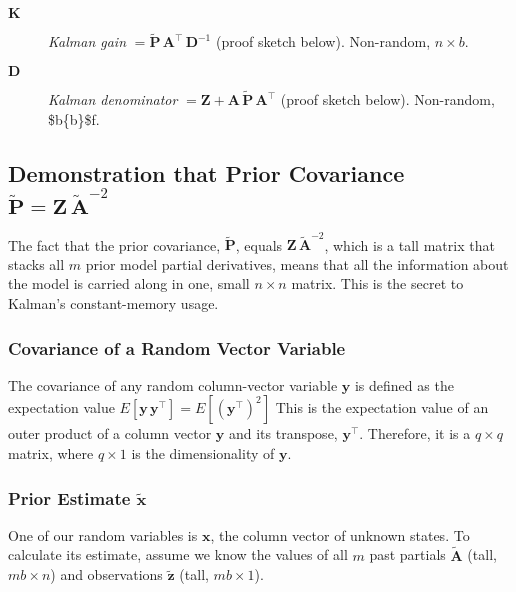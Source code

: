 \documentclass[10pt,oneside,x11names]{article}
\begin{document}
\begin{description}
\item[{\(\mathbold{K}\)}] \emph{Kalman gain}
\(=
     {\tilde{\mathbold{P}}}\,
     \mathbold{A}^\intercal\,
     {\mathbold{D}}^{-1}\) (proof
sketch below).
Non-random, \(n\times{b}\).

\item[{\(\mathbold{D}\)}] \emph{Kalman denominator}
     \(=
     \mathbold{Z}+
     \mathbold{A}\,
     {\tilde{\mathbold{P}}}\,
     \mathbold{A}^\intercal\)
     (proof sketch below). Non-random, \$b\texttimes{}\{b\}\$f.
\end{description}

\subsection{Demonstration that Prior Covariance \({\tilde{\mathbold{P}}} = \mathbold{Z}\,\tilde{\mathbold{A}}^{-2}\)}
\label{sec:orgheadline9}

The fact that the prior covariance, \(\tilde{\mathbold{P}}\), equals
\(\mathbold{Z}\,
\tilde{\mathbold{A}}^{-2}\), which is a tall matrix that stacks all \(m\) prior model
partial derivatives, means that all the information about the model is carried
along in one, small \(n\times{n}\) matrix. This is the secret to Kalman's
constant-memory usage.

\subsubsection{Covariance of a Random Vector Variable}
\label{sec:orgheadline5}

The covariance of any random column-vector variable \(\mathbold{y}\) is defined as the
expectation value
\(E
\left[
\mathbold{y}\,
\mathbold{y}^\intercal
\right]
=
E
\left[
({\mathbold{y}^\intercal})^2
\right]\)
\noindent This is the expectation value of an outer product of a column vector
\(\mathbold{y}\) and its transpose, \(\mathbold{y}^\intercal\). Therefore, it is a
\(q\times{q}\) matrix, where \(q\times{1}\) is the dimensionality of \(\mathbold{y}\).

\subsubsection{Prior Estimate \({\tilde{\mathbold{x}}}\)}
\label{sec:orgheadline6}

One of our random variables is \(\mathbold{x}\), the column vector of unknown
states. To calculate its estimate, assume we know the values of all \(m\) past
partials \({\tilde{\mathbold{A}}}\) (tall, \(m b\times{n}\)) and observations
\(\tilde{\mathbold{z}}\) (tall, \(m b\times{1}\)).
\end{document}
